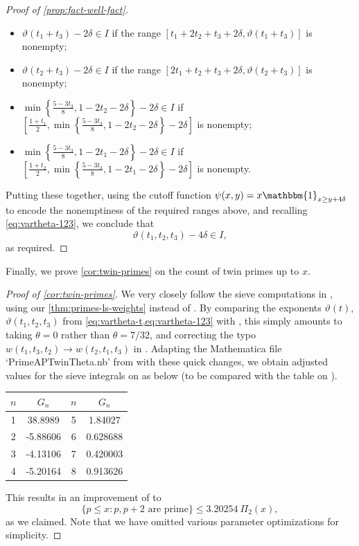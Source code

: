 \documentclass[reqno,11pt]{amsart}
\theoremstyle{remark}
\numberwithin{equation}{section}
\newcommand{\one}{\mathbbm{1}}
\begin{document}
\begin{proof}[Proof of \cref{prop:fact-well-fact}]
\begin{itemize}
    \item[$(ii)$.] $\vartheta(t_1+t_3) - 2\delta \in I$ if the range $[t_1 + 2t_2 + t_3 + 2\delta, \vartheta(t_1+t_3)]$ is nonempty;
    \item[$(iii)$.] $\vartheta(t_2 + t_3) - 2\delta \in I$ if the range $[2t_1 + t_2 + t_3 + 2\delta, \vartheta(t_2+t_3)]$ is nonempty;
    \item[$(iv)$.] $\min\left\{ \tfrac{5-3t_3}{8}, 1-2t_2-2\delta\right \} - 2\delta \in I$ if $[\tfrac{1+t_1}{2}, \min\left\{ \tfrac{5-3t_3}{8}, 1-2t_2-2\delta\right \} - 2\delta]$ is nonempty;
    \item[$(v)$.] $\min\left\{ \tfrac{5-3t_3}{8}, 1-2t_1-2\delta\right \} - 2\delta \in I$ if $[\tfrac{1+t_2}{2}, \min\left\{ \tfrac{5-3t_3}{8}, 1-2t_1-2\delta\right \} - 2\delta]$ is nonempty.
\end{itemize}
Putting these together, using the cutoff function $\psi(x, y) = x \one_{x \ge y+4\delta}$ to encode the nonemptiness of the required ranges above, and recalling \cref{eq:vartheta-123}, we conclude that
\[
    \vartheta(t_1, t_2, t_3) - 4\delta \in I,
\]
as required.
\end{proof}


Finally, we prove \cref{cor:twin-primes} on the count of twin primes up to $x$.

\begin{proof}[Proof of \cref{cor:twin-primes}] 
We very closely follow the sieve computations in \cite[Sections 7.1 and 7.2]{lichtman2023primes}, using our \cref{thm:primes-ls-weights} instead of \cite[Proposition 6.6]{lichtman2023primes}. By comparing the exponents $\vartheta(t)$, $\vartheta(t_1, t_2, t_3)$ from \cref{eq:vartheta-t,eq:vartheta-123} with \cite[(6.2) and (6.4), with $\alpha = 0$]{lichtman2023primes}, this simply amounts to taking $\theta = 0$ rather than $\theta = 7/32$, and correcting the typo $w(t_1, t_3, t_2) \to w(t_2, t_1, t_3)$ in \cite[(6.4)]{lichtman2023primes}. Adapting the Mathematica file `PrimeAPTwinTheta.nb' from \cite{lichtman2023primes} with these quick changes, we obtain adjusted values for the sieve integrals on \cite[p.\,30]{lichtman2023primes} as below (to be compared with the table on \cite[p.\,32]{lichtman2023primes}).
\begin{center}
\setlength\extrarowheight{-2pt}
\begin{tabular}{cc|cc}
$n$ & $G_n$ & $n$ & $G_n$
\\ \hline 
1 & 38.8989 & 5 & 1.84027 \\
2 & -5.88606 & 6 & 0.628688 \\ 
3 & -4.13106 & 7 & 0.420003 \\ 
4 & -5.20164 & 8 & 0.913626 
\end{tabular}
\end{center}
This results in an improvement of \cite[(7.13)]{lichtman2023primes} to
\[
    \{p \le x : p, p+2 \text{ are prime}\} \le 3.20254\ \Pi_2(x),
\]
as we claimed.
Note that we have omitted various parameter optimizations for simplicity.
\end{proof} 
\end{document}
